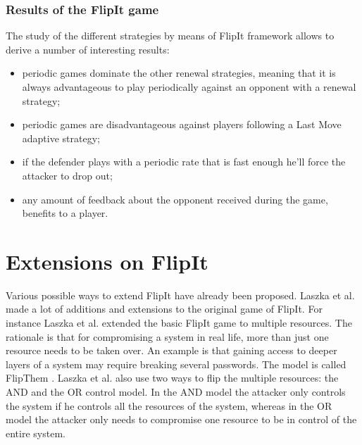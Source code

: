 \subsubsection{Results of the FlipIt game}
The study of the different strategies by means of FlipIt framework allows to derive a number of interesting results:  
\begin{itemize}
\item periodic games dominate the other renewal strategies, meaning that it is always advantageous to play periodically against an opponent with a renewal strategy;
\item periodic games are disadvantageous against players following a Last Move adaptive strategy;
\item if the defender plays with a periodic rate that is fast enough he'll force the attacker to drop out;
\item any amount of feedback about the opponent received during the game, benefits to a player.
\end{itemize}
 
 
\section{Extensions on FlipIt}
\label{ch1:extendedWork}

Various possible ways to extend FlipIt have already been proposed. 
Laszka et al. made a lot of additions and extensions to the original game of FlipIt. For instance Laszka et al. extended the basic FlipIt game to multiple resources. The rationale is that for compromising a system in real life, more than just one resource needs to be taken over. An example is that gaining access to deeper layers of a system may require breaking several passwords. The model is called FlipThem \cite{FlipThem}. Laszka et al. also use two ways to flip the multiple resources: the AND and the OR control model. In the AND model the attacker only controls the system if he controls all the resources of the system, whereas in the OR model the attacker only needs to compromise one resource to be in control of the entire system. \\

